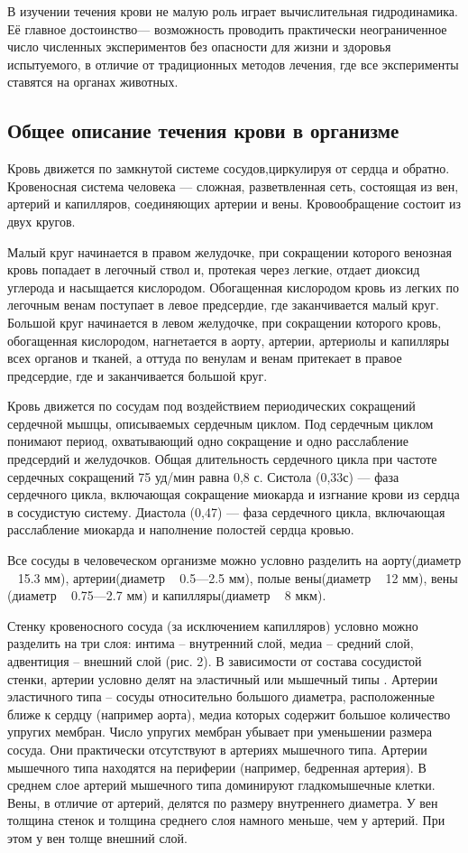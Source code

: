 В изучении течения крови не малую роль играет вычислительная гидродинамика. Её главное достоинство— возможность проводить практически неограниченное число численных экспериментов без опасности для жизни и здоровья испытуемого, в отличие от традиционных методов лечения, где все эксперименты ставятся на органах животных.

\subsection{Общее описание течения крови в организме}
Кровь движется по замкнутой системе сосудов,циркулируя от сердца и обратно. Кровеносная система человека — сложная, разветвленная сеть, состоящая из вен, артерий и капилляров, соединяющих артерии и вены. Кровообращение состоит из двух кругов.

Малый круг начинается в правом желудочке, при сокращении которого венозная кровь попадает в легочный ствол и, протекая через легкие, отдает диоксид углерода и насыщается кислородом. Обогащенная кислородом кровь из легких по легочным венам поступает в левое предсердие, где заканчивается малый круг. Большой круг начинается в левом желудочке, при сокращении которого кровь, обогащенная кислородом, нагнетается в аорту, артерии, артериолы и капилляры всех органов и тканей, а оттуда по венулам и венам притекает в правое предсердие, где и заканчивается большой круг.

Кровь движется по сосудам под воздействием периодических сокращений сердечной мышцы, описываемых сердечным циклом. Под сердечным циклом понимают период, охватывающий одно сокращение и одно расслабление предсердий и желудочков. Общая длительность сердечного цикла при частоте сердечных сокращений 75 уд/мин равна 0,8 с. Систола (0,33с) — фаза сердечного цикла, включающая сокращение миокарда и изгнание крови из сердца в сосудистую систему. Диастола (0,47) — фаза сердечного цикла, включающая расслабление миокарда и наполнение полостей сердца кровью.

Все сосуды в человеческом организме можно условно разделить на аорту(диаметр ~ 15.3 мм), артерии(диаметр ~ 0.5—2.5 мм), полые вены(диаметр ~ 12 мм), вены (диаметр ~ 0.75—2.7 мм) и капилляры(диаметр ~ 8 мкм).

Стенку кровеносного сосуда (за исключением капилляров) условно можно разделить на три слоя: интима – внутренний слой, медиа – средний слой, адвентиция – внешний слой (рис. 2).
В зависимости от состава сосудистой стенки, артерии условно делят на эластичный или мышечный типы . Артерии эластичного типа – сосуды относительно большого диаметра, расположенные ближе к сердцу (например аорта), медиа которых содержит большое количество упругих мембран. Число упругих мембран убывает при уменьшении размера сосуда. Они практически отсутствуют в артериях мышечного типа. Артерии мышечного типа находятся на периферии (например, бедренная артерия). В среднем слое артерий мышечного типа доминируют гладкомышечные клетки. Вены, в отличие от артерий, делятся по размеру внутреннего диаметра. У вен толщина стенок и толщина среднего слоя намного меньше, чем у артерий. При этом у вен толще внешний слой. \cite{Rhodin:1980} 


